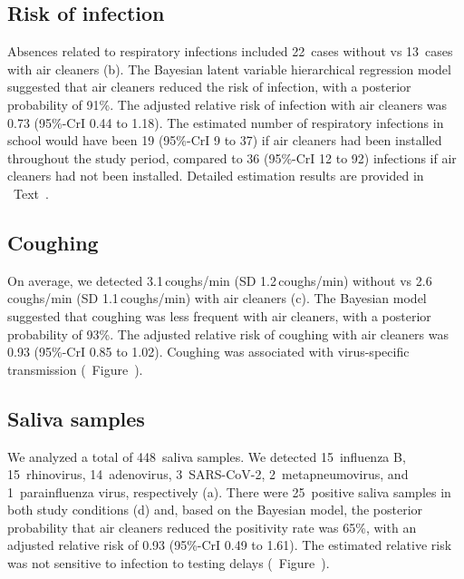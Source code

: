 \documentclass[fleqn,11pt]{wlscirep}
\begin{document}
\subsection*{Risk of infection}

Absences related to respiratory infections included 22~cases without vs 13~cases with air cleaners (b). The Bayesian latent variable hierarchical regression model suggested that air cleaners reduced the risk of infection, with a posterior probability of 91\%. The adjusted relative risk of infection with air cleaners was 0.73 (95\%-CrI 0.44 to 1.18). The estimated number of respiratory infections in school would have been 19 (95\%-CrI 9 to 37) if air cleaners had been installed throughout the study period, compared to 36 (95\%-CrI 12 to 92) infections if air cleaners had not been installed. Detailed estimation results are provided in \supp~Text~. 

\subsection*{Coughing}

On average, we detected 3.1\,coughs/min (SD 1.2\,coughs/min) without vs 2.6\,coughs/min (SD 1.1\,coughs/min) with air cleaners (c). The Bayesian model suggested that coughing was less frequent with air cleaners, with a posterior probability of 93\%. The adjusted relative risk of coughing with air cleaners was 0.93 (95\%-CrI 0.85 to 1.02). Coughing was associated with virus-specific transmission (\supp~Figure~).

\subsection*{Saliva samples}

We analyzed a total of 448~saliva samples. We detected 15~influenza B, 15~rhinovirus, 14~adenovirus, 3~SARS-CoV-2, 2~metapneumovirus, and 1~parainfluenza virus, respectively (a). There were 25~positive saliva samples in both study conditions (d) and, based on the Bayesian model, the posterior probability that air cleaners reduced the positivity rate was 65\%, with an adjusted relative risk of 0.93 (95\%-CrI 0.49 to 1.61). The estimated relative risk was not sensitive to infection to testing delays (\supp~Figure~). 
\end{document}
